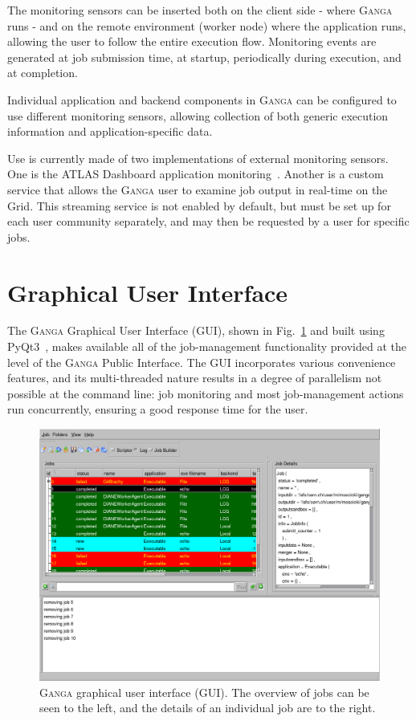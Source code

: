 \documentclass{elsart}
\def\atlas {ATLAS\xspace}
\def\ganga {\textsc{Ganga}\xspace}
\def\grid {Grid\xspace}
\begin{document}
\begin{linenumbers}
The monitoring sensors can be inserted both on the client side - where \ganga
runs - and on the remote environment (worker node) where the application
runs, allowing the user to follow the entire execution flow.  Monitoring
events are generated at job submission time, at startup, periodically
during execution, and at completion.

Individual application and backend components in \ganga can be configured to use
different monitoring sensors, allowing collection of both generic execution
information and application-specific data.

Use is currently made of two implementations of external monitoring sensors. One
is the \atlas Dashboard application monitoring~\cite{andreeva_2008}.
Another is a custom service that allows the \ganga user to examine job output
in real-time on the \grid.  This streaming service
is not enabled by default, but must be set up for each user community separately,
and may then be requested by a user for specific jobs.

\section{Graphical User Interface}
\label{sec:GUI}

The \ganga Graphical User Interface (GUI), shown in  Fig.~\ref{fig:GUI} and
built using PyQt3~\cite{rempt_2001}, makes available all of the job-management
functionality provided at the level of the \ganga Public Interface.  The
GUI incorporates various convenience features, and its multi-threaded nature
results in a degree of parallelism not possible at the command line:
job monitoring and most job-management actions run concurrently, ensuring
a good response time for the user.

\begin{figure}[ht!]
  \centering
  \includegraphics[width=1 \textwidth]{ganga-GUI}
  \caption{\ganga graphical user interface (GUI).  The overview of jobs
   can be seen to the left, and the details of an individual job are to
   the right.}
  \label{fig:GUI}
\end{figure}


\end{linenumbers}
\end{document}
